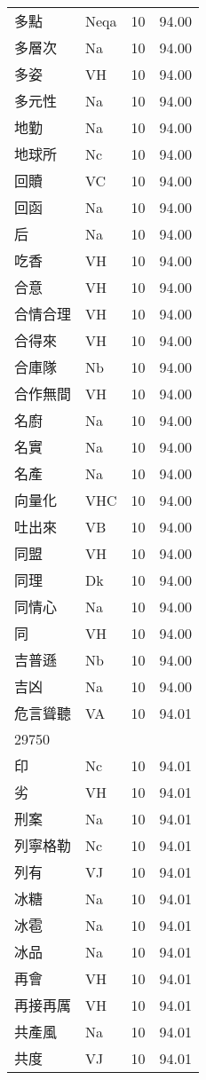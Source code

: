 \documentclass[twocolumn]{book}
\begin{document}
\begin{supertabular}{llrr}
多點 & Neqa & 10 &  94.00\\
多層次 & Na & 10 &  94.00\\
多姿 & VH & 10 &  94.00\\
多元性 & Na & 10 &  94.00\\
地勤 & Na & 10 &  94.00\\
地球所 & Nc & 10 &  94.00\\
回贖 & VC & 10 &  94.00\\
回函 & Na & 10 &  94.00\\
后 & Na & 10 &  94.00\\
吃香 & VH & 10 &  94.00\\
合意 & VH & 10 &  94.00\\
合情合理 & VH & 10 &  94.00\\
合得來 & VH & 10 &  94.00\\
合庫隊 & Nb & 10 &  94.00\\
合作無間 & VH & 10 &  94.00\\
名廚 & Na & 10 &  94.00\\
名實 & Na & 10 &  94.00\\
名產 & Na & 10 &  94.00\\
向量化 & VHC & 10 &  94.00\\
吐出來 & VB & 10 &  94.00\\
同盟 & VH & 10 &  94.00\\
同理 & Dk & 10 &  94.00\\
同情心 & Na & 10 &  94.00\\
同 & VH & 10 &  94.00\\
吉普遜 & Nb & 10 &  94.00\\
吉凶 & Na & 10 &  94.00\\
危言聳聽 & VA & 10 &  94.01\\
29750\\
印 & Nc & 10 &  94.01\\
劣 & VH & 10 &  94.01\\
刑案 & Na & 10 &  94.01\\
列寧格勒 & Nc & 10 &  94.01\\
列有 & VJ & 10 &  94.01\\
冰糖 & Na & 10 &  94.01\\
冰雹 & Na & 10 &  94.01\\
冰品 & Na & 10 &  94.01\\
再會 & VH & 10 &  94.01\\
再接再厲 & VH & 10 &  94.01\\
共產風 & Na & 10 &  94.01\\
共度 & VJ & 10 &  94.01\\

\end{supertabular}
\end{document}
